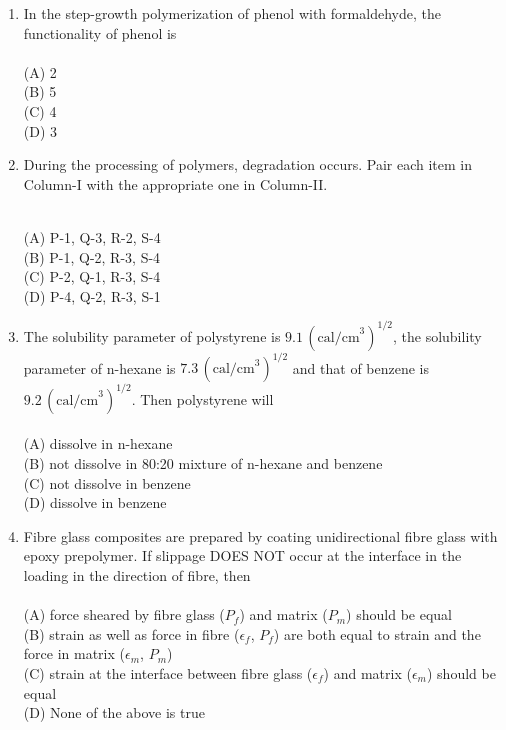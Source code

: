 \documentclass[journal,12pt,onecolumn]{IEEEtran}
\begin{document}
\begin{enumerate}[label=\arabic*)]
\item In the step-growth polymerization of phenol with formaldehyde, the functionality of phenol is\\
\vspace{0.2cm}
\hfill{} \\
(A) 2\\
(B) 5\\
(C) 4\\
(D) 3
\vspace{0.5cm}


\item During the processing of polymers, degradation occurs. Pair each item in Column-I with the appropriate one in Column-II.



\vspace{0.2cm}
\hfill{} \\

(A) P-1, Q-3, R-2, S-4\\
(B) P-1, Q-2, R-3, S-4\\
(C) P-2, Q-1, R-3, S-4\\
(D) P-4, Q-2, R-3, S-1
\vspace{0.5cm}

\item The solubility parameter of polystyrene is $9.1\,(\text{cal/cm}^3)^{1/2}$, the solubility parameter of n-hexane is $7.3\,(\text{cal/cm}^3)^{1/2}$ and that of benzene is $9.2\,(\text{cal/cm}^3)^{1/2}$. Then polystyrene will\\
\vspace{0.2cm}
\hfill{} \\
(A) dissolve in n-hexane\\
(B) not dissolve in 80:20 mixture of n-hexane and benzene\\
(C) not dissolve in benzene\\
(D) dissolve in benzene
\vspace{0.5cm}

\newpage

\item Fibre glass composites are prepared by coating unidirectional fibre glass with epoxy prepolymer. If slippage DOES NOT occur at the interface in the loading in the direction of fibre, then\\
\vspace{0.2cm}
\hfill{} \\
(A) force sheared by fibre glass ($P_f$) and matrix ($P_m$) should be equal\\
(B) strain as well as force in fibre ($\epsilon_f$, $P_f$) are both equal to strain and the force in matrix ($\epsilon_m$, $P_m$)\\
(C) strain at the interface between fibre glass ($\epsilon_f$) and matrix ($\epsilon_m$) should be equal\\
(D) None of the above is true
\vspace{0.5cm}


\end{enumerate}
\end{document}
